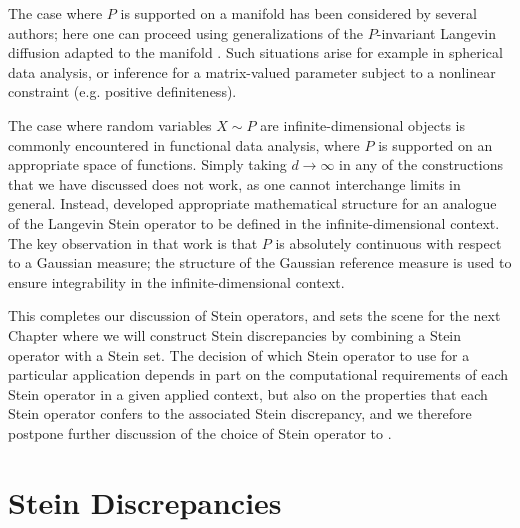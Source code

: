 \documentclass[12pt,paper=letter]{scrreprt}
\begin{document}
The case where $P$ is supported on a manifold has been considered by several authors; here one can proceed using generalizations of the $P$-invariant Langevin diffusion adapted to the manifold \citep{le2020diffusion,xu2021interpretable,barp2022riemann,qu2025theory}.
Such situations arise for example in spherical data analysis, or inference for a matrix-valued parameter subject to a nonlinear constraint (e.g. positive definiteness).

The case where random variables $X \sim P$ are infinite-dimensional objects is commonly encountered in functional data analysis, where $P$ is supported on an appropriate space of functions.
Simply taking $d \rightarrow \infty$ in any of the constructions that we have discussed does not work, as one cannot interchange limits in general.
Instead, \citet{wynne2025fourier} developed appropriate mathematical structure for an analogue of the Langevin Stein operator to be defined in the infinite-dimensional context.
The key observation in that work is that $P$ is absolutely continuous with respect to a Gaussian measure; the structure of the Gaussian reference measure is used to ensure integrability in the infinite-dimensional context.


\bigskip

This completes our discussion of Stein operators, and sets the scene for the next Chapter where we will construct Stein discrepancies by combining a Stein operator with a Stein set.
The decision of which Stein operator to use for a particular application depends in part on the computational requirements of each Stein operator in a given applied context, but also on the properties that each Stein operator confers to the associated Stein discrepancy, and we therefore postpone further discussion of the choice of Stein operator to .


\chapter{Stein Discrepancies}
\label{chap: Stein discrepancies}
\end{document}
